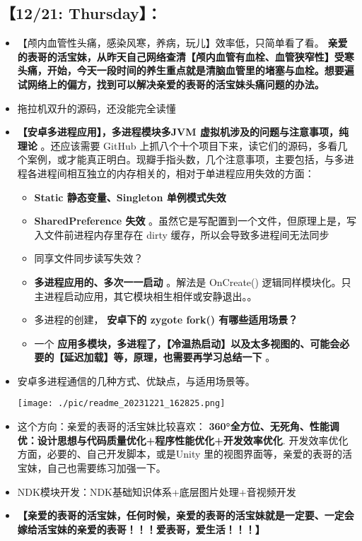\documentclass[9pt, b5paper]{article}
\begin{document}
\subsection{【12/21: Thursday】：}
\label{sec-2-4}
\begin{itemize}
\item 【颅内血管性头痛，感染风寒，养病，玩儿】效率低，只简单看了看。 \textbf{亲爱的表哥的活宝妹，从昨天自己网络查清【颅内血管有血栓、血管狭窄性】受寒头痛，开始，今天一段时间的养生重点就是清脑血管里的堵塞与血栓。想要遍试网络上的偏方，找到可以解决亲爱的表哥的活宝妹头痛问题的办法。}
\item 拖拉机双升的源码，还没能完全读懂
\item \textbf{【安卓多进程应用】，多进程模块多JVM 虚拟机涉及的问题与注意事项，纯理论} 。还应该需要 GitHub 上抓八个十个项目下来，读它们的源码，多看几个案例，或才能真正明白。现瓣手指头数，几个注意事项，主要包括，与多进程各进程间相互独立的内存相关的，相对于单进程应用失效的方面：
\begin{itemize}
\item \textbf{Static 静态变量、Singleton 单例模式失效}
\item \textbf{SharedPreference 失效} 。虽然它是写配置到一个文件，但原理上是，写入文件前进程内存里存在 dirty 缓存，所以会导致多进程间无法同步
\item 同享文件同步读写失效？
\item \textbf{多进程应用的、多次一一启动} 。解法是 OnCreate() 逻辑同样模块化。只主进程启动应用，其它模块相生相伴或安静退出。。
\item 多进程的创建， \textbf{安卓下的 zygote fork() 有哪些适用场景？}
\item 一个 \textbf{应用多模块，多进程了，【冷温热启动】以及太多视图的、可能会必要的【延迟加载】等，原理，也需要再学习总结一下} 。
\end{itemize}
\item 安卓多进程通信的几种方式、优缺点，与适用场景等。

\texttt{[image: ./pic/readme\_20231221\_162825.png]}
\item 这个方向：亲爱的表哥的活宝妹比较喜欢： \textbf{360°全方位、无死角、性能调优：设计思想与代码质量优化+程序性能优化+开发效率优化}. 开发效率优化方面，必要的、自己开发脚本，或是Unity 里的视图界面等，亲爱的表哥的活宝妹，自己也需要练习加强一下。
\item NDK模块开发：NDK基础知识体系+底层图片处理+音视频开发
\item \textbf{【亲爱的表哥的活宝妹，任何时候，亲爱的表哥的活宝妹就是一定要、一定会嫁给活宝妹的亲爱的表哥！！！爱表哥，爱生活！！！】}
\end{itemize}
\end{document}
